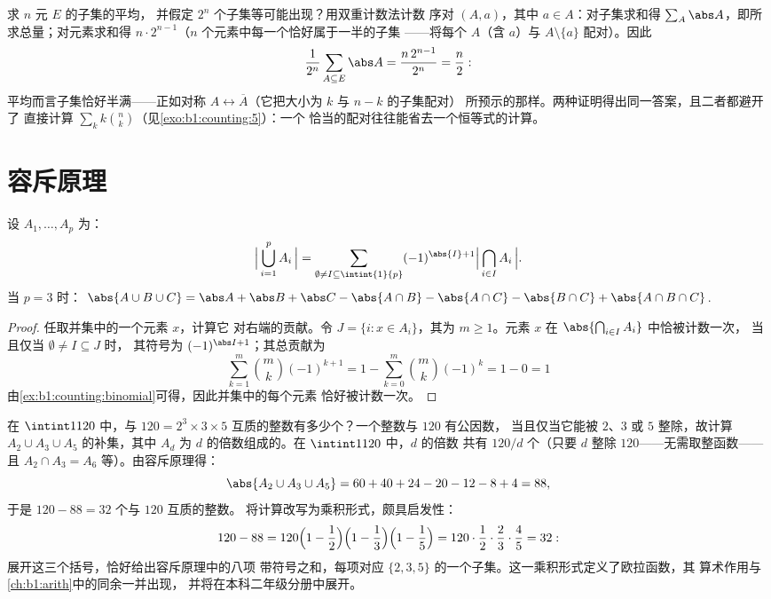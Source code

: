 \begin{example}[平均子集]\label{ex:b1:counting:averagesubset}
求 $n$ 元 $E$ 的子集的平均，
并假定 $2^n$ 个子集等可能出现？用双重计数法计数
序对 $(A, a)$，其中 $a \in A$：对子集求和得
$\sum_A \abs A$，即所求总量；对元素求和得
$n \cdot 2^{n-1}$（$n$ 个元素中每一个恰好属于一半的子集
——将每个 $A$（含 $a$）与 $A
\setminus \{a\}$ 配对）。因此
\[
\frac{1}{2^n}\sum_{A \subseteq E} \abs A
= \frac{n\,2^{n-1}}{2^n} = \frac n2 :
\]
平均而言子集恰好半满——正如对称 $A
\leftrightarrow \overline A$（它把大小为 $k$ 与 $n - k$ 的子集配对）
所预示的那样。两种证明得出同一答案，且二者都避开了
直接计算 $\sum_k k\binom nk$（见\cref{exo:b1:counting:5}）：一个
恰当的配对往往能省去一个恒等式的计算。
\end{example}

\section{容斥原理}

\begin{theorem}[容斥原理]\label{thm:b1:counting:inclexcl}
设 $A_1, \dots, A_p$ 为：
\[
\Bigl|\, \bigcup_{i=1}^{p} A_i \,\Bigr|
= \sum_{\emptyset \neq I \subseteq \intint{1}{p}}
(-1)^{\abs{I}+1} \Bigl|\, \bigcap_{i \in I} A_i \,\Bigr| .
\]
当 $p = 3$ 时：
$\abs{A \cup B \cup C} = \abs A + \abs B + \abs C - \abs{A \cap B} -
\abs{A \cap C} - \abs{B \cap C} + \abs{A \cap B \cap C}$.
\end{theorem}

\begin{proof}
任取并集中的一个元素 $x$，计算它
对右端的贡献。令 $J = \{i : x \in A_i\}$，其为 $m \geq
1$。元素 $x$ 在 $\abs{\bigcap_{i \in I} A_i}$ 中恰被计数一次，
当且仅当 $\emptyset \neq I \subseteq J$ 时，
其符号为 $(-1)^{\abs I + 1}$；其总贡献为
\[
\sum_{k=1}^{m} \binom{m}{k} (-1)^{k+1}
= 1 - \sum_{k=0}^{m} \binom mk (-1)^k = 1 - 0 = 1
\]
由\cref{ex:b1:counting:binomial}可得，因此并集中的每个元素
恰好被计数一次。
\end{proof}

\begin{example}[计数互质的整数]\label{ex:b1:counting:coprime}
在 $\intint1{120}$ 中，与 $120 = 2^3
\times 3 \times 5$ 互质的整数有多少个？一个整数与 $120$ 有公因数，
当且仅当它能被 $2$、$3$ 或 $5$ 整除，故计算
$A_2 \cup A_3 \cup A_5$ 的补集，其中 $A_d$ 为
$d$ 的倍数组成的。在 $\intint1{120}$ 中，$d$ 的倍数
共有 $120/d$ 个（只要 $d$ 整除 $120$——无需取整函数——且
$A_2 \cap A_3 = A_6$ 等）。由容斥原理得：
\[
\abs{A_2 \cup A_3 \cup A_5}
= 60 + 40 + 24 - 20 - 12 - 8 + 4 = 88 ,
\]
于是 $120 - 88 = 32$ 个与 $120$ 互质的整数。
将计算改写为乘积形式，颇具启发性：
\[
120 - 88 = 120\Bigl(1 - \frac12\Bigr)\Bigl(1 -
\frac13\Bigr)\Bigl(1 - \frac15\Bigr) = 120 \cdot \frac12 \cdot
\frac23 \cdot \frac45 = 32 :
\]
展开这三个括号，恰好给出容斥原理中的八项
带符号之和，每项对应 $\{2, 3,
5\}$ 的一个子集。这一乘积形式定义了欧拉函数，其
算术作用与\cref{ch:b1:arith}中的同余一并出现，
并将在本科二年级分册中展开。
\end{example}

